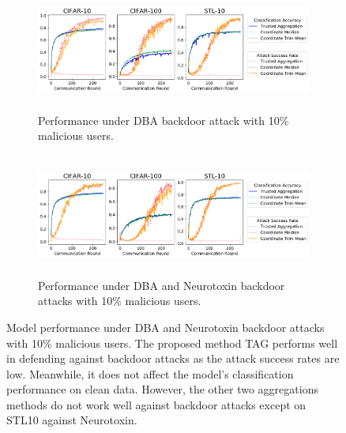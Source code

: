 \documentclass{article} %
\begin{document}
\begin{figure}[htp]
\centering
  \begin{subfigure}{\textwidth}
  \centering
    \includegraphics[height=4cm, width=\textwidth]{make_article/make_visuals/visuals/accuracy--n_malicious1--dba0--beta0.2.png}
    \caption{\footnotesize Performance under DBA backdoor attack with 10\% malicious users.}
  \end{subfigure}%

  \begin{subfigure}{\textwidth}
  \centering
    \includegraphics[height=4cm, width=\textwidth]{make_article/make_visuals/visuals/accuracy--n_malicious1--dba0--beta0.2--neuro_p0.1.png}
    \caption{\footnotesize Performance under DBA and Neurotoxin backdoor attacks with 10\% malicious users.}
  \end{subfigure}%
\caption{\footnotesize Model performance under DBA and Neurotoxin backdoor attacks with 10\% malicious users. The proposed method TAG performs well in defending against backdoor attacks as the attack success rates are low. Meanwhile, it does not affect the model's classification performance on clean data. However, the other two aggregations methods do not work well against backdoor attacks except on STL10 against Neurotoxin.} 
\label{fig: accuracy--n_malicious1}
\end{figure}
\end{document}
